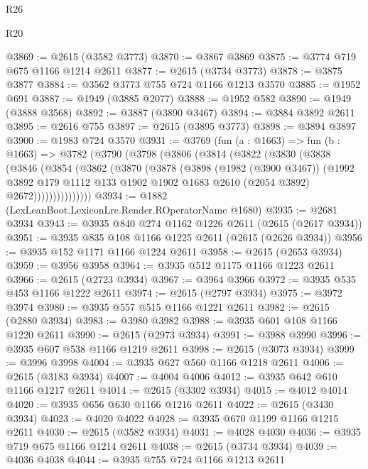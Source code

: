 \begin{lexlean}{R26}
\begin{lexlean}{R20}
\begin{coremodule}
{{{{{{{{{{{{{{{{{{{{{{{{{{{{{{{{{{{{{{{{{{{{{{{{{{{{{{{{{{{{{{{@3869 := @2615 (@3582 @3773)
@3870 := @3867 @3869
@3875 := @3774 @719 @675 @1166 @1214 @2611
@3877 := @2615 (@3734 @3773)
@3878 := @3875 @3877
@3884 := @3562 @3773 @755 @724 @1166 @1213 @3570
@3885 := @1952 @691
@3887 := @1949 (@3885 @2077)
@3888 := @1952 @582
@3890 := @1949 (@3888 @3568)
@3892 := @3887 (@3890 @3467)
@3894 := @3884 @3892 @2611
@3895 := @2616 @755
@3897 := @2615 (@3895 @3773)
@3898 := @3894 @3897
@3900 := @1983 @724 @3570
@3931 := @3769
    (fun (a : @1663) =>
    fun (b : @1663) =>
    @3782
      (@3790
        (@3798
          (@3806
            (@3814
              (@3822
                (@3830
                  (@3838
                    (@3846
                      (@3854
                        (@3862
                          (@3870
                            (@3878
                              (@3898
                                (@1982 (@3900 @3467))
                                (@1992
                                  @3892
                                  @179
                                  @1112
                                  @133
                                  @1902
                                  @1902
                                  @1683
                                  @2610
                                  (@2054 @3892)
                                  @2672)))))))))))))))
@3934 := @1882 (LexLeanBoot.LexiconLre.Render.ROperatorName @1680)
@3935 := @2681 @3934
@3943 := @3935 @840 @274 @1162 @1226 @2611 (@2615 (@2617 @3934))
@3951 := @3935 @835 @108 @1166 @1225 @2611 (@2615 (@2626 @3934))
@3956 := @3935 @152 @1171 @1166 @1224 @2611
@3958 := @2615 (@2653 @3934)
@3959 := @3956 @3958
@3964 := @3935 @512 @1175 @1166 @1223 @2611
@3966 := @2615 (@2723 @3934)
@3967 := @3964 @3966
@3972 := @3935 @535 @453 @1166 @1222 @2611
@3974 := @2615 (@2797 @3934)
@3975 := @3972 @3974
@3980 := @3935 @557 @515 @1166 @1221 @2611
@3982 := @2615 (@2880 @3934)
@3983 := @3980 @3982
@3988 := @3935 @601 @108 @1166 @1220 @2611
@3990 := @2615 (@2973 @3934)
@3991 := @3988 @3990
@3996 := @3935 @607 @538 @1166 @1219 @2611
@3998 := @2615 (@3073 @3934)
@3999 := @3996 @3998
@4004 := @3935 @627 @560 @1166 @1218 @2611
@4006 := @2615 (@3183 @3934)
@4007 := @4004 @4006
@4012 := @3935 @642 @610 @1166 @1217 @2611
@4014 := @2615 (@3302 @3934)
@4015 := @4012 @4014
@4020 := @3935 @656 @630 @1166 @1216 @2611
@4022 := @2615 (@3430 @3934)
@4023 := @4020 @4022
@4028 := @3935 @670 @1199 @1166 @1215 @2611
@4030 := @2615 (@3582 @3934)
@4031 := @4028 @4030
@4036 := @3935 @719 @675 @1166 @1214 @2611
@4038 := @2615 (@3734 @3934)
@4039 := @4036 @4038
@4044 := @3935 @755 @724 @1166 @1213 @2611
}}}}}}}}}}}}}}}}}}}}}}}}}}}}}}}}}}}}}}}}}}}}}}}}}}}}}}}}}}}}}}}
\end{coremodule}
\end{lexlean}
\end{lexlean}
